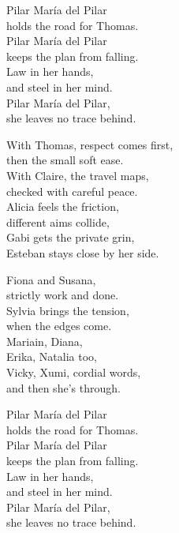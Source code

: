 \begin{lyrics}
Pilar María del Pilar\\
holds the road for Thomas.\\
Pilar María del Pilar\\
keeps the plan from falling.\\
Law in her hands,\\
and steel in her mind.\\
Pilar María del Pilar,\\
she leaves no trace behind.

With Thomas, respect comes first,\\
then the small soft ease.\\
With Claire, the travel maps,\\
checked with careful peace.\\
Alicia feels the friction,\\
different aims collide,\\
Gabi gets the private grin,\\
Esteban stays close by her side.

Fiona and Susana,\\
strictly work and done.\\
Sylvia brings the tension,\\
when the edges come.\\
Mariain, Diana,\\
Erika, Natalia too,\\
Vicky, Xumi, cordial words,\\
and then she’s through.

Pilar María del Pilar\\
holds the road for Thomas.\\
Pilar María del Pilar\\
keeps the plan from falling.\\
Law in her hands,\\
and steel in her mind.\\
Pilar María del Pilar,\\
she leaves no trace behind.
\end{lyrics}

